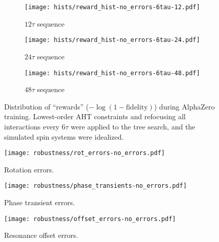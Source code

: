 \begin{figure}[H]
    \centering
    \begin{subfigure}{.49\textwidth}
        \centering
        \texttt{[image: hists/reward\_hist-no\_errors-6tau-12.pdf]}
        \caption{$12\tau$ sequence}
        \label{fig:reward_hist-no_errors-6tau-12}
    \end{subfigure}
    \begin{subfigure}{.49\textwidth}
        \centering
        \texttt{[image: hists/reward\_hist-no\_errors-6tau-24.pdf]}
        \caption{$24\tau$ sequence}
        \label{fig:reward_hist-no_errors-6tau-24}
    \end{subfigure}
    \begin{subfigure}{.49\textwidth}
        \centering
        \texttt{[image: hists/reward\_hist-no\_errors-6tau-48.pdf]}
        \caption{$48\tau$ sequence}
        \label{fig:reward_hist-no_errors-6tau-48}
    \end{subfigure}
    \caption{Distribution of ``rewards'' ($-\log(1 - \text{fidelity})$) during AlphaZero training. Lowest-order AHT constraints and refocusing all interactions every $6\tau$ were applied to the tree search, and the simulated spin systems were idealized.}
    \label{fig:reward_hist-no_errors-6tau}
\end{figure}



\begin{figure}[H]
    \centering
    \texttt{[image: robustness/rot\_errors-no\_errors.pdf]}
    \caption{Rotation errors. %
    }
    \label{fig:rot_errors-no_errors}
\end{figure}

\begin{figure}[H]
    \centering
    \texttt{[image: robustness/phase\_transients-no\_errors.pdf]}
    \caption{Phase transient errors. %
    }
    \label{fig:phase_transients-no_errors}
\end{figure}

\begin{figure}[H]
    \centering
    \texttt{[image: robustness/offset\_errors-no\_errors.pdf]}
    \caption{Resonance offset errors. %
    }
    \label{fig:offset_errors-no_errors}
\end{figure}

